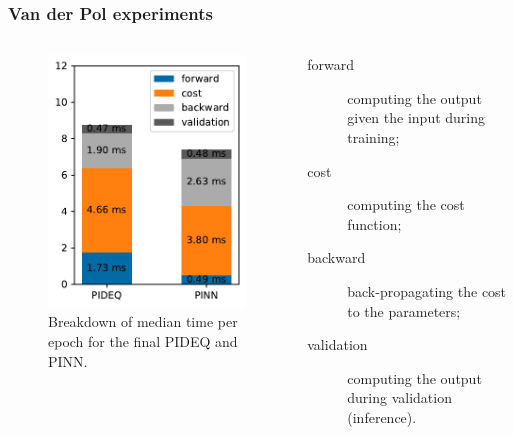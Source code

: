 \documentclass[t]{beamer}
\begin{document}
\begin{frame}
    \frametitle{Van der Pol experiments}
    \begin{columns}[T] 
	\begin{column}{.6\textwidth}
	    \vspace{-10pt}
	    \begin{figure}[h]
	        \centering
		\includegraphics[width=.6\textwidth]{../images/final_times.pdf}
		\caption{Breakdown of median time per epoch for the final PIDEQ and PINN.}
		\label{fig:final-times}
	    \end{figure}
        \end{column}
	\begin{column}{.4\textwidth} 
	    \begin{description}
		\item[\textcolor{tabblue}{forward}] computing the output given the input during training;
		\item[\textcolor{taborange}{cost}] computing the cost function;
		\item[\textcolor{tabgray}{backward}] back-propagating the cost to the parameters;
		\item[\textcolor{tabdarkgray}{validation}] computing the output during validation (inference).
	    \end{description}
	\end{column}
    \end{columns}
    
\end{frame}
\end{document}
